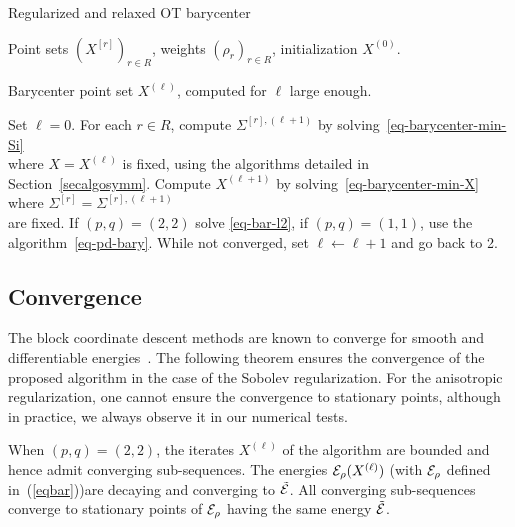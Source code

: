 \begin{algorithm}[ht!]
\caption{Regularized and relaxed OT barycenter}
\label{algo-block-barycenters}
\Require Point sets $(X^{[r]})_{r \in R}$, weights $(\rho_r)_{r \in R}$, initialization $X^{(0)}$.

\Ensure Barycenter point set $X^{(\ell)}$, computed for $\ell$ large enough.

\begin{enumerate}
	 Set $\ell=0$.
	 For each $r \in R$, compute $\Sigma^{[r],(\ell+1)}$ by solving~\eqref{eq-barycenter-min-Si} \\
		 where $X=X^{(\ell)}$ is fixed, using the algorithms detailed in Section~\ref{secalgosymm}.
	 Compute $X^{(\ell+1)}$ by solving~\eqref{eq-barycenter-min-X} where $\Sigma^{[r]} = \Sigma^{[r],(\ell+1)}$ \\
			are fixed.
			If $(p,q)=(2,2)$ solve \eqref{eq-bar-l2}, if $(p,q)=(1,1)$, use the algorithm~\eqref{eq-pd-bary}.
	 While not converged, set $\ell \leftarrow \ell+1$ and go back to 2.
\end{enumerate}
\end{algorithm}



\subsection{Convergence}


The block coordinate descent methods are known to converge for smooth and differentiable energies~\cite{tseng-proximal}. The following theorem ensures the convergence of the proposed algorithm in the case of the Sobolev regularization. For the anisotropic regularization, one cannot ensure the convergence to stationary points, although in practice, we always observe it in our numerical tests.

\begin{thm}
	When $(p,q)=(2,2)$, the iterates $X^{(\ell)}$ of the algorithm are bounded and hence admit converging sub-sequences.
	The energies $\mathcal{E}_\rho(X^{(\ell)})$ (with  $\mathcal{E}_\rho$ defined in~(\ref{eqbar}))are decaying and converging to $\tilde{\mathcal{E}}$.
	 All converging sub-sequences converge to stationary points of $\mathcal{E}_\rho$ having the same energy $\tilde{\mathcal{E}}$.
\end{thm}

